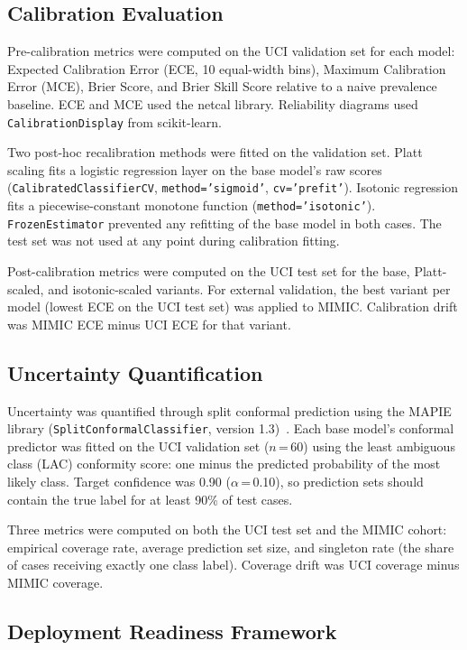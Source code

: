 \subsection{Calibration Evaluation}

Pre-calibration metrics were computed on the UCI validation set for each model: Expected Calibration Error (ECE, 10 equal-width bins), Maximum Calibration Error (MCE), Brier Score, and Brier Skill Score relative to a naive prevalence baseline. ECE and MCE used the netcal library. Reliability diagrams used \texttt{CalibrationDisplay} from scikit-learn.

Two post-hoc recalibration methods were fitted on the validation set. Platt scaling fits a logistic regression layer on the base model's raw scores (\texttt{CalibratedClassifierCV}, \texttt{method='sigmoid'}, \texttt{cv='prefit'}). Isotonic regression fits a piecewise-constant monotone function (\texttt{method='isotonic'}). \texttt{FrozenEstimator} prevented any refitting of the base model in both cases. The test set was not used at any point during calibration fitting.

Post-calibration metrics were computed on the UCI test set for the base, Platt-scaled, and isotonic-scaled variants. For external validation, the best variant per model (lowest ECE on the UCI test set) was applied to MIMIC. Calibration drift was MIMIC ECE minus UCI ECE for that variant.

\subsection{Uncertainty Quantification}

Uncertainty was quantified through split conformal prediction using the MAPIE library (\texttt{SplitConformalClassifier}, version 1.3)~\cite{Taquet2022,AngelopoulosBates2022}. Each base model's conformal predictor was fitted on the UCI validation set ($n$\,=\,60) using the least ambiguous class (LAC) conformity score: one minus the predicted probability of the most likely class. Target confidence was 0.90 ($\alpha$\,=\,0.10), so prediction sets should contain the true label for at least 90\% of test cases.

Three metrics were computed on both the UCI test set and the MIMIC cohort: empirical coverage rate, average prediction set size, and singleton rate (the share of cases receiving exactly one class label). Coverage drift was UCI coverage minus MIMIC coverage.

\subsection{Deployment Readiness Framework}

